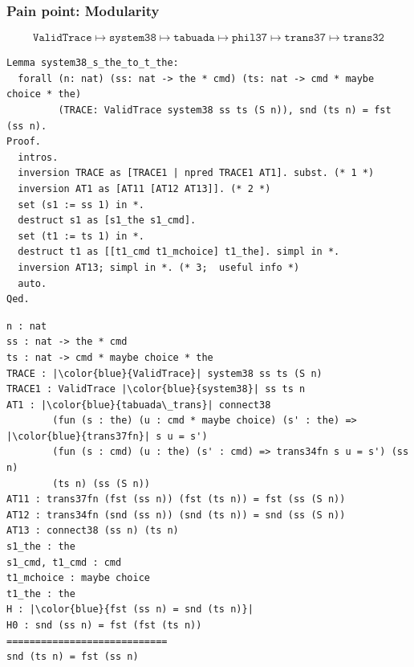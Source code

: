 \documentclass{beamer}
\begin{document}
\begin{frame}[fragile]
\frametitle{Pain point: Modularity}
{ \footnotesize
$$
\texttt{ValidTrace} \mapsto
\texttt{system38} \mapsto
\texttt{tabuada} \mapsto 
\texttt{phil37} \mapsto
\texttt{trans37}  \mapsto 
\texttt{trans32}
$$
}
\pause
{\tiny
  \begin{verbatim}
Lemma system38_s_the_to_t_the: 
  forall (n: nat) (ss: nat -> the * cmd) (ts: nat -> cmd * maybe choice * the)
         (TRACE: ValidTrace system38 ss ts (S n)), snd (ts n) = fst (ss n).
Proof.
  intros.
  inversion TRACE as [TRACE1 | npred TRACE1 AT1]. subst. (* 1 *)
  inversion AT1 as [AT11 [AT12 AT13]]. (* 2 *)
  set (s1 := ss 1) in *.
  destruct s1 as [s1_the s1_cmd].
  set (t1 := ts 1) in *.
  destruct t1 as [[t1_cmd t1_mchoice] t1_the]. simpl in *.
  inversion AT13; simpl in *. (* 3;  useful info *)
  auto.
Qed.
\end{verbatim}
\pause
}
{\fontsize{2.5}{4}
\begin{verbatim}  
n : nat
ss : nat -> the * cmd
ts : nat -> cmd * maybe choice * the
TRACE : |\color{blue}{ValidTrace}| system38 ss ts (S n)
TRACE1 : ValidTrace |\color{blue}{system38}| ss ts n
AT1 : |\color{blue}{tabuada\_trans}| connect38
        (fun (s : the) (u : cmd * maybe choice) (s' : the) => |\color{blue}{trans37fn}| s u = s')
        (fun (s : cmd) (u : the) (s' : cmd) => trans34fn s u = s') (ss n) 
        (ts n) (ss (S n))
AT11 : trans37fn (fst (ss n)) (fst (ts n)) = fst (ss (S n))
AT12 : trans34fn (snd (ss n)) (snd (ts n)) = snd (ss (S n))
AT13 : connect38 (ss n) (ts n)
s1_the : the
s1_cmd, t1_cmd : cmd
t1_mchoice : maybe choice
t1_the : the
H : |\color{blue}{fst (ss n) = snd (ts n)}|
H0 : snd (ss n) = fst (fst (ts n))
============================
snd (ts n) = fst (ss n)
\end{verbatim}
}
\end{frame}
\end{document}

